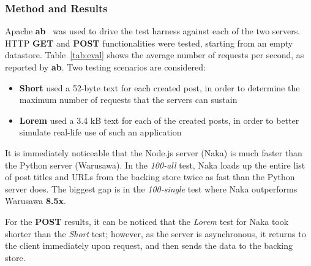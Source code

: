 \subsubsection*{\label{sec:eval:mr}Method and Results}

Apache \textbf{ab}~\cite{ab} was used to drive the test harness against each of the two servers. HTTP \textbf{GET} and \textbf{POST} functionalities were tested, starting from an empty datastore. Table~\ref{tab:eval} shows the average number of requests per second, as reported by \textbf{ab}. Two testing scenarios are considered:

\begin{itemize}
    \item \textbf{Short} used a 52-byte text for each created post, in order to determine the maximum number of requests that the servers can sustain
    \item \textbf{Lorem} used a 3.4 kB text for each of the created posts, in order to better simulate real-life use of such an application
\end{itemize}

It is immediately noticeable that the Node.js server (Naka) is much faster than the Python server (Warusawa). In the \emph{100-all} test, Naka loads up the entire list of post titles and URLs from the backing store twice as fast than the Python server does. The biggest gap is in the \emph{100-single} test where Naka outperforms Warusawa \textbf{8.5x}.

For the \textbf{POST} results, it can be noticed that the \emph{Lorem} test for Naka took shorter than the \emph{Short} test; however, as the server is asynchronous, it returns to the client immediately upon request, and then sends the data to the backing store.
